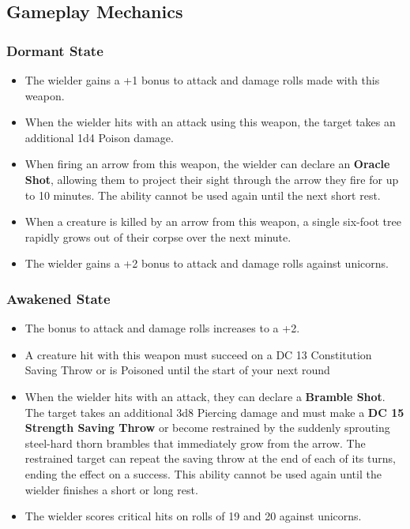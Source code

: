 \subsection*{Gameplay Mechanics}
{\entryfont
\subsubsection*{Dormant State}
\begin{itemize}
	\item The wielder gains a +1 bonus to attack and damage rolls made with this weapon.
	\item When the wielder hits with an attack using this weapon, the target takes an additional 1d4 Poison damage.
	\item When firing an arrow from this weapon, the wielder can declare an \textbf{Oracle Shot}, allowing them to project their sight through the arrow they fire for up to 10 minutes. The ability cannot be used again until the next short rest.
	\item When a creature is killed by an arrow from this weapon, a single six-foot tree rapidly grows out of their corpse over the next minute.
	\item The wielder gains a +2 bonus to attack and damage rolls against unicorns.
\end{itemize}
\subsubsection*{Awakened State}
\begin{itemize}
	\item The bonus to attack and damage rolls increases to a +2.
	\item A creature hit with this weapon must succeed on a DC 13 Constitution Saving Throw or is Poisoned until the start of your next round
	\item When the wielder hits with an attack, they can declare a \textbf{Bramble Shot}. The target takes an additional 3d8 Piercing damage and must make a \textbf{DC 15 Strength Saving Throw} or become restrained by the suddenly sprouting steel-hard thorn brambles that immediately grow from the arrow. The restrained target can repeat the saving throw at the end of each of its turns, ending the effect on a success. This ability cannot be used again until the wielder finishes a short or long rest.
	\item The wielder scores critical hits on rolls of 19 and 20 against unicorns.
\end{itemize}
}
